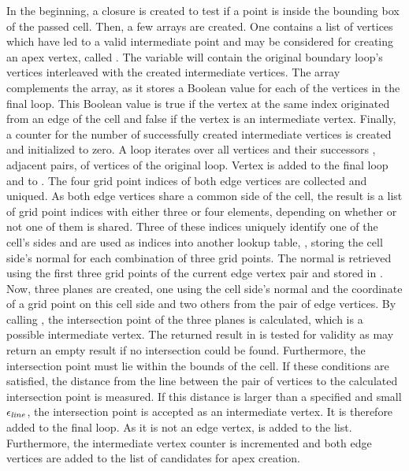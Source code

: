 %
In the beginning, a closure is created to test if a point is inside the bounding box of the passed cell.
Then, a few arrays are created.
One contains a list of vertices which have led to a valid intermediate point and may be considered for creating an apex vertex, called .
The variable  will contain the original boundary loop's vertices interleaved with the created intermediate vertices.
The  array complements the  array, as it stores a Boolean value for each of the vertices in the final loop.
This Boolean value is true if the vertex at the same index originated from an edge of the cell and false if the vertex is an intermediate vertex.
Finally, a counter for the number of successfully created intermediate vertices is created and initialized to zero.
A loop iterates over all vertices  and their successors , \ie adjacent pairs, of vertices of the original loop.
Vertex  is added to the final loop and \True to .
The four grid point indices of both edge vertices are collected and uniqued.
As both edge vertices share a common side of the cell, the result is a list of grid point indices with either three or four elements, depending on whether or not one of them is shared.
Three of these indices uniquely identify one of the cell's sides and are used as indices into another lookup table, , storing the cell side's normal for each combination of three grid points.
The normal is retrieved using the first three grid points of the current edge vertex pair and stored in .
Now, three planes are created, one using the cell side's normal and the coordinate of a grid point on this cell side and two others from the pair of edge vertices.
By calling , the intersection point of the three planes is calculated, which is a possible intermediate vertex.
The returned result in  is tested for validity as  may return an empty result if no intersection could be found.
Furthermore, the intersection point must lie within the bounds of the cell.
If these conditions are satisfied, the distance from the line between the pair of vertices to the calculated intersection point is measured.
If this distance is larger than a specified and small $\epsilon_{\mathit{line}}$, the intersection point is accepted as an intermediate vertex.
It is therefore added to the final loop.
As it is not an edge vertex, \False is added to the  list.
Furthermore, the intermediate vertex counter is incremented and both edge vertices are added to the list of candidates for apex creation.

